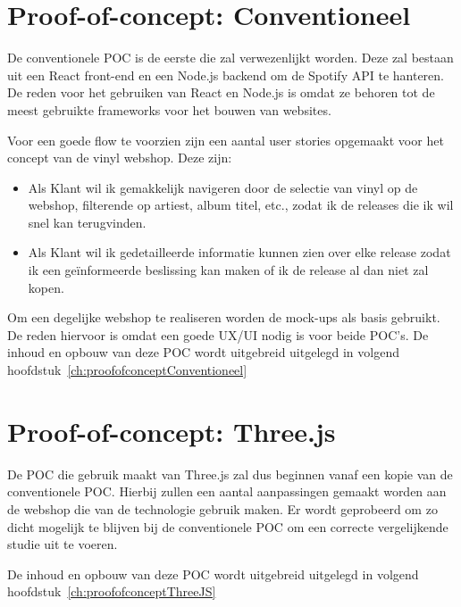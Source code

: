 \pagebreak

\section{Proof-of-concept: Conventioneel}

De conventionele POC is de eerste die zal verwezenlijkt worden. Deze zal bestaan uit een React front-end en een Node.js backend om de Spotify API te hanteren. De reden voor het gebruiken van React en Node.js is omdat ze behoren tot de meest gebruikte frameworks voor het bouwen van websites.

Voor een goede flow te voorzien zijn een aantal user stories opgemaakt voor het concept van de vinyl webshop. Deze zijn:

\begin{itemize}
	\item Als Klant wil ik gemakkelijk navigeren door de selectie van vinyl op de webshop, filterende op artiest, album titel, etc., zodat ik de releases die ik wil snel kan terugvinden.
	\item Als Klant wil ik gedetailleerde informatie kunnen zien over elke release zodat ik een geïnformeerde beslissing kan maken of ik de release al dan niet zal kopen.
\end{itemize}

Om een degelijke webshop te realiseren worden de mock-ups als basis gebruikt. De reden hiervoor is omdat een goede UX/UI nodig is voor beide POC's. De inhoud en opbouw van deze POC wordt uitgebreid uitgelegd in volgend hoofdstuk~\ref{ch:proofofconceptConventioneel}

\section{Proof-of-concept: Three.js}

De POC die gebruik maakt van Three.js zal dus beginnen vanaf een kopie van de conventionele POC. Hierbij zullen een aantal aanpassingen gemaakt worden aan de webshop die van de technologie gebruik maken. Er wordt geprobeerd om zo dicht mogelijk te blijven bij de conventionele POC om een correcte vergelijkende studie uit te voeren.

De inhoud en opbouw van deze POC wordt uitgebreid uitgelegd in volgend hoofdstuk~\ref{ch:proofofconceptThreeJS}